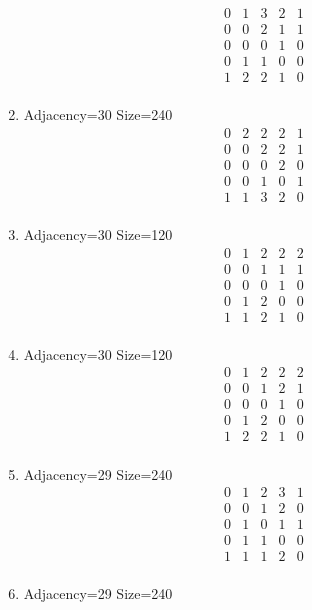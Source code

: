 \documentclass[12pt]{article}
\begin{document}
\begin{multicols}{3}
\begin{enumerate}
\begin{equation*}
\begin{array}{ccccc}
0&1&3&2&1\\
0&0&2&1&1\\
0&0&0&1&0\\
0&1&1&0&0\\
1&2&2&1&0\\
\end{array}
\end{equation*}
\item Adjacency=30 Size=240
\begin{equation*}
\begin{array}{ccccc}
0&2&2&2&1\\
0&0&2&2&1\\
0&0&0&2&0\\
0&0&1&0&1\\
1&1&3&2&0\\
\end{array}
\end{equation*}
\item Adjacency=30 Size=120
\begin{equation*}
\begin{array}{ccccc}
0&1&2&2&2\\
0&0&1&1&1\\
0&0&0&1&0\\
0&1&2&0&0\\
1&1&2&1&0\\
\end{array}
\end{equation*}
\item Adjacency=30 Size=120
\begin{equation*}
\begin{array}{ccccc}
0&1&2&2&2\\
0&0&1&2&1\\
0&0&0&1&0\\
0&1&2&0&0\\
1&2&2&1&0\\
\end{array}
\end{equation*}
\item Adjacency=29 Size=240
\begin{equation*}
\begin{array}{ccccc}
0&1&2&3&1\\
0&0&1&2&0\\
0&1&0&1&1\\
0&1&1&0&0\\
1&1&1&2&0\\
\end{array}
\end{equation*}
\item Adjacency=29 Size=240

\end{enumerate}
\end{multicols}
\end{document}
